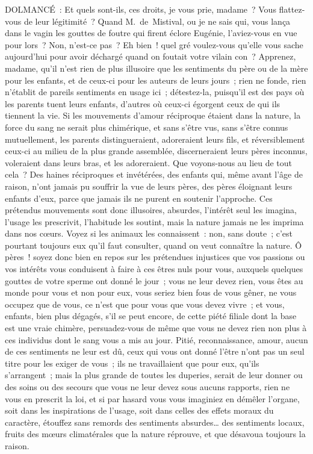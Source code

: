 \documentclass[french,twoside]{book} %
\begin{document}
DOLMANCÉ : Et quels sont-ils, ces droits, je vous prie, madame ? Vous flattez-vous de leur légitimité ? Quand M. de Mistival, ou je ne sais qui, vous lança dans le vagin les gouttes de foutre qui firent éclore Eugénie, l’aviez-vous en vue pour lors ? Non, n’est-ce pas ? Eh bien ! quel gré voulez-vous qu’elle vous sache aujourd’hui pour avoir déchargé quand on foutait votre vilain con ? Apprenez, madame, qu’il n’est rien de plus illusoire que les sentiments du père ou de la mère pour les enfants, et de ceux-ci pour les auteurs de leurs jours ; rien ne fonde, rien n’établit de pareils sentiments en usage ici ; détestez-la, puisqu’il est des pays où les parents tuent leurs enfants, d’autres où ceux-ci égorgent ceux de qui ils tiennent la vie. Si les mouvements d’amour réciproque étaient dans la nature, la force du sang ne serait plus chimérique, et sans s’être vus, sans s’être connus mutuellement, les parents distingueraient, adoreraient leurs fils, et réversiblement ceux-ci au milieu de la plus grande assemblée, discerneraient leurs pères inconnus, voleraient dans leurs bras, et les adoreraient. Que voyons-nous au lieu de tout cela ? Des haines réciproques et invétérées, des enfants qui, même avant l’âge de raison, n’ont jamais pu souffrir la vue de leurs pères, des pères éloignant leurs enfants d’eux, parce que jamais ils ne purent en soutenir l’approche. Ces prétendus mouvements sont donc illusoires, absurdes, l’intérêt seul les imagina, l’usage les prescrivit, l’habitude les soutint, mais la nature jamais ne les imprima dans nos cœurs. Voyez si les animaux les connaissent : non, sans doute ; c’est pourtant toujours eux qu’il faut consulter, quand on veut connaître la nature. Ô pères ! soyez donc bien en repos sur les prétendues injustices que vos passions ou vos intérêts vous conduisent à faire à ces êtres nuls pour vous, auxquels quelques gouttes de votre sperme ont donné le jour ; vous ne leur devez rien, vous êtes au monde pour vous et non pour eux, vous seriez bien fous de vous gêner, ne vous occupez que de vous, ce n’est que pour vous que vous devez vivre ; et vous, enfants, bien plus dégagés, s’il se peut encore, de cette piété filiale dont la base est une vraie chimère, persuadez-vous de même que vous ne devez rien non plus à ces individus dont le sang vous a mis au jour. Pitié, reconnaissance, amour, aucun de ces sentiments ne leur est dû, ceux qui vous ont donné l’être n’ont pas un seul titre pour les exiger de vous ; ils ne travaillaient que pour eux, qu’ils s’arrangent ; mais la plus grande de toutes les duperies, serait de leur donner ou des soins ou des secours que vous ne leur devez sous aucuns rapports, rien ne vous en prescrit la loi, et si par hasard vous vous imaginiez en démêler l’organe, soit dans les inspirations de l’usage, soit dans celles des effets moraux du caractère, étouffez sans remords des sentiments absurdes… des sentiments locaux, fruits des mœurs climatérales que la nature réprouve, et que désavoua toujours la raison.\par
\end{document}

